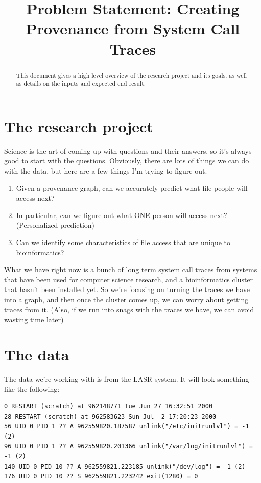 \documentclass{article}
\title{Problem Statement: Creating Provenance from System Call Traces}
\begin{document}
\maketitle

\begin{abstract}
This document gives a high level overview of the research project and its goals, as well as details on the inputs and expected end result.
\end{abstract}

\section{The research project}
Science is the art of coming up with questions and their answers, so it's always good to start with the questions. Obviously, there are lots of things we can do with the data, but here are a few things I'm trying to figure out.
\begin{enumerate}
\item Given a provenance graph, can we accurately predict what file people will access next?
\item In particular, can we figure out what ONE person will access next? (Personalized prediction)
\item Can we identify some characteristics of file access that are unique to bioinformatics?
\end{enumerate}

What we have right now is a bunch of long term system call traces from systems that have been used for computer science research, and a bioinformatics cluster that hasn't been installed yet. So we're focusing on turning the traces we have into a graph, and then once the cluster comes up, we can worry about getting traces from it. (Also, if we run into snags with the traces we have, we can avoid wasting time later)

\section{The data}
The data we're working with is from the LASR system.  It will look something like the following:
\begin{verbatim}
0 RESTART (scratch) at 962148771 Tue Jun 27 16:32:51 2000
28 RESTART (scratch) at 962583623 Sun Jul  2 17:20:23 2000
56 UID 0 PID 1 ?? A 962559820.187587 unlink("/etc/initrunlvl") = -1 (2)
96 UID 0 PID 1 ?? A 962559820.201366 unlink("/var/log/initrunlvl") = -1 (2)
140 UID 0 PID 10 ?? A 962559821.223185 unlink("/dev/log") = -1 (2)
176 UID 0 PID 10 ?? S 962559821.223242 exit(1280) = 0
\end{verbatim}
\end{document}
